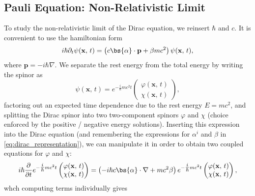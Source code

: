 \subsection{Pauli Equation: Non-Relativistic Limit}

To study the non-relativistic limit of the Dirac equation, we reinsert \(\hbar\) and \(c\). It is convenient to use the hamiltonian form
\[
    i \hbar \partial_t \psi(\mathbf{x},\,t) = \left( c \bs{\alpha} \cdot \mathbf{p} + \beta m c^2 \right) \psi(\mathbf{x},\,t),
\]
where \(\mathbf{p} = -i \hbar \nabla\). We separate the rest energy from the total energy by writing the spinor as
\begin{equation}
    \psi(\mathbf{x},\,t) = e^{-\tfrac{i}{\hbar} m c^2 t} \begin{pmatrix}
        \varphi(\mathbf{x},\,t) \\
        \chi(\mathbf{x},\,t)
    \end{pmatrix},
    \label{eq:dirac_spinor_split}
\end{equation}
factoring out an expected time dependence due to the rest energy \(E = mc^2\), and splitting the Dirac spinor into two two-component spinors \(\varphi\) and \(\chi\) (choice enforced by the positive / negative energy solutions). Inserting this expression into the Dirac equation (and remembering the expressions for \(\alpha^i\) and \(\beta\) in \eqref{eq:dirac_representation}), we can manipulate it in order to obtain two coupled equations for \(\varphi\) and \(\chi\):
\[
    i \hbar \frac{\partial}{\partial t} e^{-\tfrac{i}{\hbar} m c^2 t} \begin{pmatrix}
        \varphi(\mathbf{x},\,t) \\
        \chi(\mathbf{x},\,t)
    \end{pmatrix} = \left(- i \hbar c \bs{\alpha} \cdot \nabla + mc^2 \beta\right)e^{-\tfrac{i}{\hbar} m c^2 t} \begin{pmatrix}
        \varphi(\mathbf{x},\,t) \\
        \chi(\mathbf{x},\,t)
    \end{pmatrix},
\]
whch computing terms individually gives
